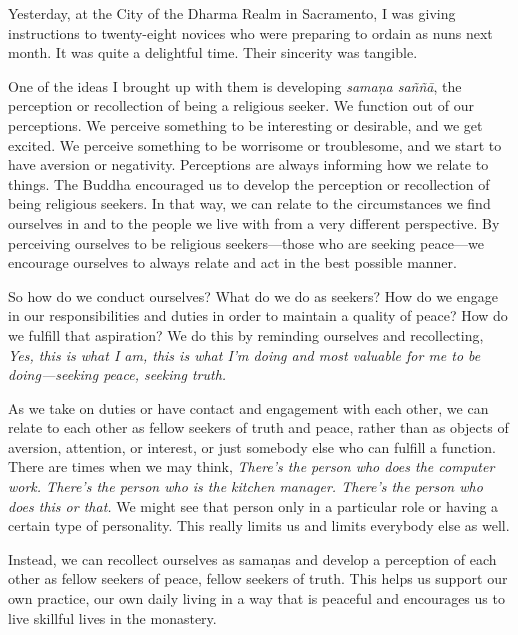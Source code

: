 
Yesterday, at the City of the Dharma Realm in Sacramento, I was giving 
instructions to twenty-eight novices who were preparing to ordain as 
nuns next month. It was quite a delightful time. Their sincerity was 
tangible.

One of the ideas I brought up with them is developing \emph{samaṇa 
saññā}, the perception or recollection of being a religious seeker. 
We function out of our perceptions. We perceive something to be 
interesting or desirable, and we get excited. We perceive something to 
be worrisome or troublesome, and we start to have aversion or 
negativity. Perceptions are always informing how we relate to things. 
The Buddha encouraged us to develop the perception or recollection of 
being religious seekers. In that way, we can relate to the 
circumstances we find ourselves in and to the people we live with from 
a very different perspective. By perceiving ourselves to be religious 
seekers---those who are seeking peace---we encourage ourselves to 
always relate and act in the best possible manner.

So how do we conduct ourselves? What do we do as seekers? How do we 
engage in our responsibilities and duties in order to maintain a 
quality of peace? How do we fulfill that aspiration? We do this by 
reminding ourselves and recollecting, \emph{Yes, this is what I am, 
this is what I'm doing and most valuable for me to be doing---seeking 
peace, seeking truth.}

As we take on duties or have contact and engagement with each other, we 
can relate to each other as fellow seekers of truth and peace, rather 
than as objects of aversion, attention, or interest, or just somebody 
else who can fulfill a function. There are times when we may think, 
\emph{There's the person who does the computer work. There's the person 
who is the kitchen manager. There's the person who does this or that.} 
We might see that person only in a particular role or having a certain 
type of personality. This really limits us and limits everybody else as 
well.

Instead, we can recollect ourselves as samaṇas and develop a 
perception of each other as fellow seekers of peace, fellow seekers of 
truth. This helps us support our own practice, our own daily living in 
a way that is peaceful and encourages us to live skillful lives in the 
monastery.


